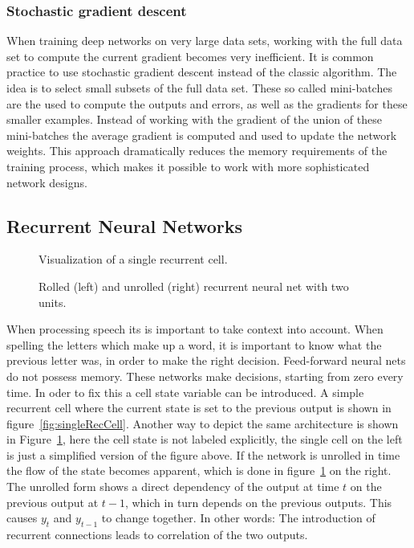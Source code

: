 \subsubsection{Stochastic gradient descent}
When training deep  networks on very large data sets, working with the full data set to compute the current gradient becomes very inefficient. It is common practice to use stochastic gradient descent instead of the classic algorithm. The idea is to select small subsets of the full data set. These so called mini-batches are the used to compute the outputs and errors, as well as the gradients for these smaller examples. Instead of working with the gradient of the union of these mini-batches the average gradient is computed and used to update the network weights. This approach dramatically reduces the memory requirements of the training process, which makes it possible to work with more sophisticated network designs.

\subsection{Recurrent Neural Networks}
\begin{figure}
\centering

\caption{Visualization of a single recurrent cell.}
\label{fig:singleRecCell}

\caption{Rolled (left) and unrolled (right) recurrent neural net with two units.}
\label{fig:unrolledNet}
\end{figure}
When processing speech its is important to take context into account. When spelling the letters which make up a word, it is important to know what the previous letter was, in order to make the right decision.
Feed-forward neural nets do not possess memory. These networks make decisions, starting from zero every time. In oder to fix this a cell state variable can be introduced. A simple recurrent cell where the current state is set to the previous output is shown in figure~\ref{fig:singleRecCell}. Another way to depict the same architecture is shown in Figure~\ref{fig:unrolledNet}, here the cell state is not labeled explicitly, the single cell on the left is just a simplified version of the figure above. If the network is unrolled in time the flow of the state becomes apparent, which is done in figure~\ref{fig:unrolledNet} on the right.
The unrolled form shows a direct dependency of the output at time $t$ on the previous output at $t-1$, which in turn depends on the previous outputs. This causes $y_t$ and $y_{t-1}$ to change together. In other words: The introduction of recurrent connections leads to correlation of the two outputs.


